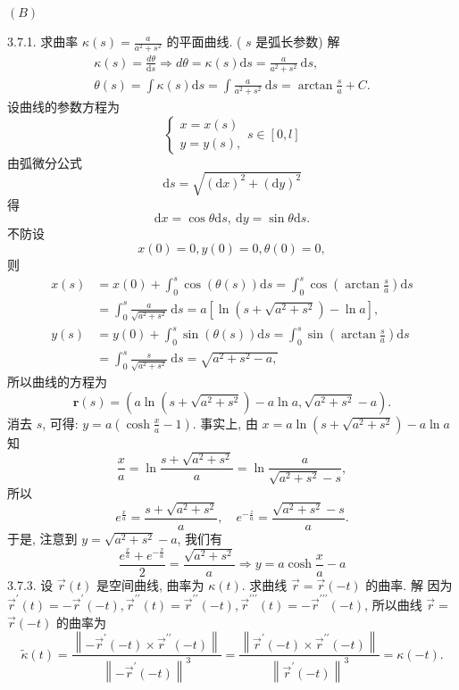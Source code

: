 \documentclass[a4paper,11pt,UTF8]{article}
\begin{document}
\centerline{$(B)$}
3.7.1. 求曲率 $\kappa(s)=\frac{a}{a^2+s^2}$ 的平面曲线. ( $s$ 是弧长参数)
解
$$
\begin{gathered}
	\kappa(s)=\frac{d \theta}{\mathrm{d} s} \Rightarrow d \theta=\kappa(s) \mathrm{d} s=\frac{a}{a^2+s^2} \mathrm{~d} s, \\
	\theta(s)=\int \kappa(s) \mathrm{d} s=\int \frac{a}{a^2+s^2} \mathrm{~d} s=\arctan \frac{s}{a}+C .
\end{gathered}
$$
设曲线的参数方程为
$$
\left\{\begin{array}{l}
	x=x(s) \\
	y=y(s),
\end{array} s \in[0, l]\right.
$$
由弧微分公式
$$
\mathrm{d} s=\sqrt{(\mathrm{d} x)^2+(\mathrm{d} y)^2}
$$
得
$$
\mathrm{d} x=\cos \theta \mathrm{d} s, \mathrm{~d} y=\sin \theta \mathrm{d} s .
$$
不防设
$$
x(0)=0, y(0)=0, \theta(0)=0,
$$
则
$$
\begin{aligned}
	x(s) & =x(0)+\int_0^s \cos (\theta(s)) \mathrm{d} s=\int_0^s \cos \left(\arctan \frac{s}{a}\right) \mathrm{d} s \\
	& =\int_0^s \frac{a}{\sqrt{a^2+s^2}} \mathrm{~d} s=a\left[\ln \left(s+\sqrt{a^2+s^2}\right)-\ln a\right], \\
	y(s) & =y(0)+\int_0^s \sin (\theta(s)) \mathrm{d} s=\int_0^s \sin \left(\arctan \frac{s}{a}\right) \mathrm{d} s \\
	& =\int_0^s \frac{s}{\sqrt{a^2+s^2}} \mathrm{~d} s=\sqrt{a^2+s^2-a,}
\end{aligned}
$$所以曲线的方程为
$$
\mathbf{r}(s)=\left(a \ln \left(s+\sqrt{a^2+s^2}\right)-a \ln a, \sqrt{a^2+s^2}-a\right) .
$$
消去 $s$, 可得: $y=a\left(\cosh \frac{x}{a}-1\right)$. 事实上, 由 $x=a \ln \left(s+\sqrt{a^2+s^2}\right)-a \ln a$ 知
$$
\frac{x}{a}=\ln \frac{s+\sqrt{a^2+s^2}}{a}=\ln \frac{a}{\sqrt{a^2+s^2}-s},
$$
所以
$$
e^{\frac{x}{a}}=\frac{s+\sqrt{a^2+s^2}}{a}, \quad e^{-\frac{z}{a}}=\frac{\sqrt{a^2+s^2}-s}{a} .
$$
于是, 注意到 $y=\sqrt{a^2+s^2}-a$, 我们有
$$
\frac{e^{\frac{x}{a}}+e^{-\frac{x}{a}}}{2}=\frac{\sqrt{a^2+s^2}}{a} \Rightarrow y=a \cosh \frac{x}{a}-a
$$
3.7.3. 设 $\vec{r}(t)$ 是空间曲线, 曲率为 $\kappa(t)$. 求曲线 $\vec{r}=\vec{r}(-t)$ 的曲率.
解 因为 $\vec{r}^{\prime}(t)=-\vec{r}^{\prime}(-t), \vec{r}^{\prime \prime}(t)=\vec{r}^{\prime \prime}(-t), \vec{r}^{\prime \prime \prime}(t)=-\vec{r}^{\prime \prime \prime}(-t)$, 所以曲线 $\vec{r}=$ $\vec{r}(-t)$ 的曲率为
$$
\tilde{\kappa}(t)=\frac{\left\|-\vec{r}^{\prime}(-t) \times \vec{r}^{\prime \prime}(-t)\right\|}{\left\|-\vec{r}^{\prime}(-t)\right\|^3}=\frac{\left\|\vec{r}^{\prime}(-t) \times \vec{r}^{\prime \prime}(-t)\right\|}{\left\|\vec{r}^{\prime}(-t)\right\|^3}=\kappa(-t) .
$$\\
\end{document}

